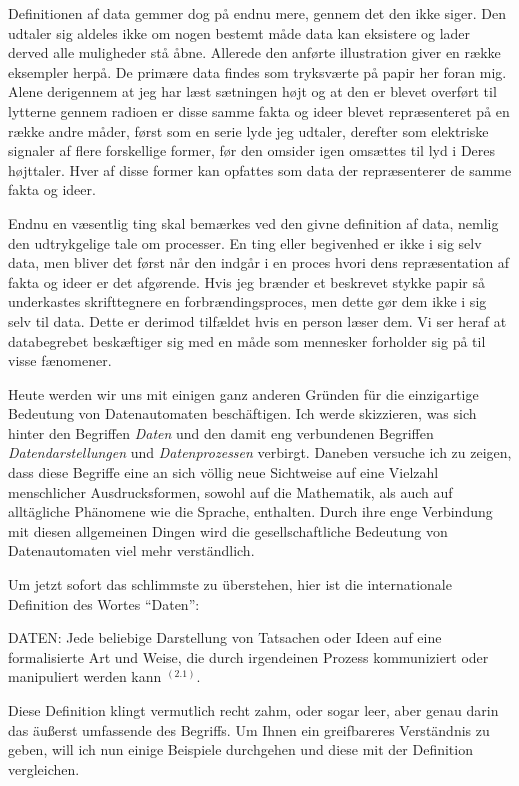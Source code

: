 {Definitionen af data gemmer dog på endnu mere, gennem det den ikke siger. Den udtaler sig aldeles ikke om nogen bestemt måde data kan eksistere og lader derved alle muligheder stå åbne. Allerede den anførte illustration giver en række eksempler herpå. De primære data findes som tryksværte på papir her foran mig. Alene derigennem at jeg har læst sætningen højt og at den er blevet overført til lytterne gennem radioen er disse samme fakta og ideer blevet repræsenteret på en række andre måder, først som en serie lyde jeg udtaler, derefter som elektriske signaler af flere forskellige former, før den omsider igen omsættes til lyd i Deres højttaler. Hver af disse former kan opfattes som data der repræsenterer de samme fakta og ideer. 

Endnu en væsentlig ting skal bemærkes ved den givne definition af data, nemlig den udtrykgelige tale om processer. En ting eller begivenhed er ikke i sig selv data, men bliver det først når den indgår i en proces hvori dens repræsentation af fakta og ideer er det afgørende. Hvis jeg brænder et beskrevet stykke papir så underkastes skrifttegnere en forbrændingsproces, men dette gør dem ikke i sig selv til data. Dette er derimod tilfældet hvis en person læser dem. Vi ser heraf at databegrebet beskæftiger sig med en måde som mennesker forholder sig på til visse fænomener.
}{
Heute werden wir uns mit einigen ganz anderen Gründen für die einzigartige Bedeutung von Datenautomaten beschäftigen. Ich werde skizzieren, was sich hinter den Begriffen \emph{Daten} und den damit eng verbundenen Begriffen \emph{Datendarstellungen} und \emph{Datenprozessen} verbirgt. Daneben versuche ich zu zeigen, dass diese Begriffe eine an sich völlig neue Sichtweise auf eine Vielzahl menschlicher Ausdrucksformen, sowohl auf die Mathematik, als auch auf alltägliche Phänomene wie die Sprache, enthalten. Durch ihre enge Verbindung mit diesen allgemeinen Dingen wird die gesellschaftliche Bedeutung von Datenautomaten viel mehr verständlich. 

Um jetzt sofort das schlimmste zu überstehen, hier ist die internationale Definition des Wortes \enquote{Daten}: 

DATEN: Jede beliebige Darstellung von Tatsachen oder Ideen auf eine formalisierte Art und Weise, die durch irgendeinen Prozess kommuniziert oder manipuliert werden kann $^{(2.1)}$.

Diese Definition klingt vermutlich recht zahm, oder sogar leer, aber genau darin das äußerst umfassende des Begriffs.
Um Ihnen ein greifbareres Verständnis zu geben, will ich nun einige Beispiele durchgehen und diese mit der Definition vergleichen.

}
